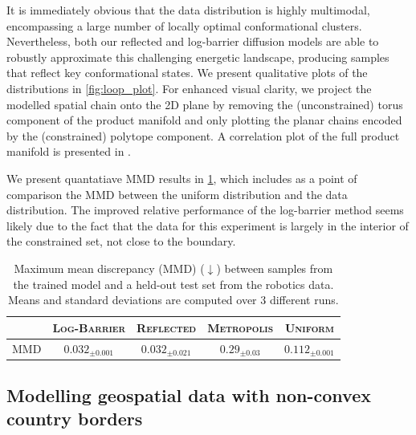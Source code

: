 It is immediately obvious that the data distribution is highly multimodal, encompassing a large number of locally optimal conformational clusters.
Nevertheless, both our reflected and log-barrier diffusion models are able to robustly approximate this challenging energetic landscape, producing samples that reflect key conformational states.
We present qualitative plots of the distributions in \cref{fig:loop_plot}.
For enhanced visual clarity, we project the modelled spatial chain onto the 2D plane by removing the (unconstrained) torus component of the product manifold and only plotting the planar chains encoded by the (constrained) polytope component.
A correlation plot of the full product manifold is presented in .

We present quantatiave MMD results in \cref{tab:loop_mmd_results}, which includes as a point of comparison the MMD between the uniform distribution and the data distribution.
The improved relative performance of the log-barrier method seems likely due to the fact that the data for this experiment is largely in the interior of the constrained set, not close to the boundary.


\begin{table}[h]
	\caption{
		Maximum mean discrepancy (MMD) (\(\downarrow\)) between samples from the trained model and a held-out test set from the robotics data.
		Means and standard deviations are computed over 3 different runs.
	}
	\label{tab:loop_mmd_results}
	\centering

	\begin{tabular}{rcccc}
		\toprule
		& {\scshape Log-Barrier}                & {\scshape Reflected}                  & {\scshape Metropolis} & {\scshape Uniform} \\
		\midrule
		\scshape MMD & \(0.032_{\pm{0.001}}\) & \(0.032_{\pm{0.021}}\) & \( 0.29_{\pm 0.03}\) & \(0.112_{\pm{0.001}}\) \\
		\bottomrule
	\end{tabular}
\end{table}

\subsection{Modelling geospatial data with non-convex country borders}
\label{sec:exp_constrained_country}

